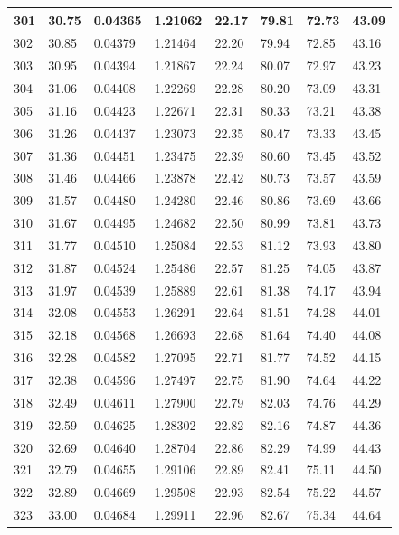 \documentclass[12pt,a4paper,twoside]{article}
\begin{document}
\begin{center}
\begin{longtable}{l l l l | l l l l}
301 & 30.75 & 0.04365 & 1.21062 & 22.17 & 79.81 & 72.73 & 43.09 \\ \hline
302 & 30.85 & 0.04379 & 1.21464 & 22.20 & 79.94 & 72.85 & 43.16 \\ \hline
303 & 30.95 & 0.04394 & 1.21867 & 22.24 & 80.07 & 72.97 & 43.23 \\ \hline
304 & 31.06 & 0.04408 & 1.22269 & 22.28 & 80.20 & 73.09 & 43.31 \\ \hline
305 & 31.16 & 0.04423 & 1.22671 & 22.31 & 80.33 & 73.21 & 43.38 \\ \hline
306 & 31.26 & 0.04437 & 1.23073 & 22.35 & 80.47 & 73.33 & 43.45 \\ \hline
307 & 31.36 & 0.04451 & 1.23475 & 22.39 & 80.60 & 73.45 & 43.52 \\ \hline
308 & 31.46 & 0.04466 & 1.23878 & 22.42 & 80.73 & 73.57 & 43.59 \\ \hline
309 & 31.57 & 0.04480 & 1.24280 & 22.46 & 80.86 & 73.69 & 43.66 \\ \hline
310 & 31.67 & 0.04495 & 1.24682 & 22.50 & 80.99 & 73.81 & 43.73 \\ \hline
311 & 31.77 & 0.04510 & 1.25084 & 22.53 & 81.12 & 73.93 & 43.80 \\ \hline
312 & 31.87 & 0.04524 & 1.25486 & 22.57 & 81.25 & 74.05 & 43.87 \\ \hline
313 & 31.97 & 0.04539 & 1.25889 & 22.61 & 81.38 & 74.17 & 43.94 \\ \hline
314 & 32.08 & 0.04553 & 1.26291 & 22.64 & 81.51 & 74.28 & 44.01 \\ \hline
315 & 32.18 & 0.04568 & 1.26693 & 22.68 & 81.64 & 74.40 & 44.08 \\ \hline
316 & 32.28 & 0.04582 & 1.27095 & 22.71 & 81.77 & 74.52 & 44.15 \\ \hline
317 & 32.38 & 0.04596 & 1.27497 & 22.75 & 81.90 & 74.64 & 44.22 \\ \hline
318 & 32.49 & 0.04611 & 1.27900 & 22.79 & 82.03 & 74.76 & 44.29 \\ \hline
319 & 32.59 & 0.04625 & 1.28302 & 22.82 & 82.16 & 74.87 & 44.36 \\ \hline
320 & 32.69 & 0.04640 & 1.28704 & 22.86 & 82.29 & 74.99 & 44.43 \\ \hline
321 & 32.79 & 0.04655 & 1.29106 & 22.89 & 82.41 & 75.11 & 44.50 \\ \hline
322 & 32.89 & 0.04669 & 1.29508 & 22.93 & 82.54 & 75.22 & 44.57 \\ \hline
323 & 33.00 & 0.04684 & 1.29911 & 22.96 & 82.67 & 75.34 & 44.64 \\ \hline

\end{longtable}
\end{center}
\end{document}
